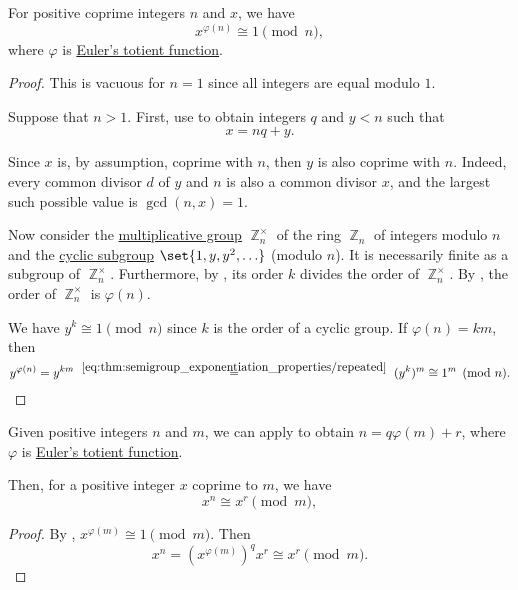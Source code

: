 \begin{theorem}\label{thm:eulers_totient_theorem}
  For positive coprime integers \( n \) and \( x \), we have
  \begin{equation*}
    x^{\varphi(n)} \cong 1 \pmod n,
  \end{equation*}
  where \( \varphi \) is \hyperref[def:eulers_totient_function]{Euler's totient function}.
\end{theorem}
\begin{proof}
  This is vacuous for \( n = 1 \) since all integers are equal modulo \( 1 \).

  Suppose that \( n > 1 \). First, use  to obtain integers \( q \) and \( y < n \) such that
  \begin{equation*}
    x = nq + y.
  \end{equation*}

  Since \( x \) is, by assumption, coprime with \( n \), then \( y \) is also coprime with \( n \). Indeed, every common divisor \( d \) of \( y \) and \( n \) is also a common divisor \( x \), and the largest such possible value is \( \gcd(n, x) = 1 \).

  Now consider the \hyperref[def:semiring]{multiplicative group} \( \BbbZ_n^\times \) of the ring \hyperref[thm:ring_of_integers_modulo]{\( \BbbZ_n \)} of integers modulo \( n \) and the \hyperref[def:cyclic_group]{cyclic subgroup} \( \set{ 1, y, y^2, \ldots } \) (modulo \( n \)). It is necessarily finite as a subgroup of \( \BbbZ_n^\times \). Furthermore, by , its order \( k \) divides the order of \( \BbbZ_n^\times \). By , the order of \( \BbbZ_n^\times \) is \( \varphi(n) \).

  We have \( y^k \cong 1 \pmod n \) since \( k \) is the order of a cyclic group. If \( \varphi(n) = km \), then
  \begin{equation*}
    y^{\varphi(n)}
    =
    y^{km}
    \reloset {\eqref{eq:thm:semigroup_exponentiation_properties/repeated}} =
    (y^k)^m
    \cong
    1^m
    \pmod n.
  \end{equation*}
\end{proof}

\begin{corollary}\label{thm:division_modulo}
  Given positive integers \( n \) and \( m \), we can apply  to obtain \( n = q \varphi(m) + r \), where \( \varphi \) is \hyperref[def:eulers_totient_function]{Euler's totient function}.

  Then, for a positive integer \( x \) coprime to \( m \), we have
  \begin{equation*}
    x^n \cong x^r \pmod m,
  \end{equation*}
\end{corollary}
\begin{proof}
  By , \( x^{\varphi(m)} \cong 1 \pmod m \). Then
  \begin{equation*}
    x^n = (x^{\varphi(m)})^q x^r \cong x^r \pmod m.
  \end{equation*}
\end{proof}

